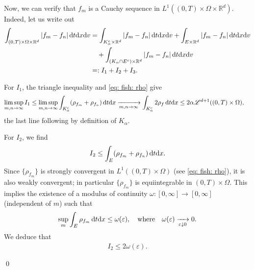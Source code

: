 \documentclass[10pt, reqno]{amsart}
\theoremstyle{plain}
\theoremstyle{definition}
\theoremstyle{remark}
\renewenvironment{proof}[1][\proofname]{\noindent{\scshape #1.\quad}}{\qed}
\numberwithin{equation}{section}
\newcommand{\R}{\mathbb{R}}
\newcommand{\ve}{\varepsilon}
\newcommand{\dx}{\textnormal{d}x}
\newcommand{\dv}{\textnormal{d}v}
\newcommand{\dt}{\textnormal{d}t}
\begin{document}
\begin{proof}[Proof of Lemma \ref{lem: key compactness}]
    Now, we can verify that $f_m$ is a Cauchy sequence in $L^1((0,T)\times\Omega\times\R^d)$. Indeed, let us write out
    \begin{align*}
 \int_{(0,T)\times\Omega\times\R^d} |f_m - f_n| \,\dt\dx\dv  
        &= \int_{K_\alpha^c \times \R^d} |f_m - f_n|\,\dt\dx\dv + \int_{E\times \R^d} |f_m - f_n|\,\dt\dx\dv \\
        &\quad + \int_{(K_\alpha \cap E^c)\times \R^d} |f_m - f_n|\,\dt\dx\dv \\
        &=: I_1 + I_2 + I_3.
    \end{align*}
    
    For $I_1$, the triangle inequality and \eqref{eq: fish: rho} give
    \begin{align*}
        \limsup_{m,n\to\infty} I_1 &\le \limsup_{m,n\to\infty} \int_{K_\alpha^c} (\rho_{f_m} + \rho_{f_n}) \,\dt\dx  \xrightarrow[m,n\to\infty]{} \int_{K_\alpha^c} 2\rho_f \,\dt\dx  \le 2\alpha \mathscr{L}^{d+1}((0,T)\times\Omega),
    \end{align*}
    the last line following by definition of $K_\alpha$.

    For $I_2$, we find 
    \begin{align*}
        I_2 \le \int_E (\rho_{f_m} + \rho_{f_n}) \,\dt\dx.
    \end{align*}
    Since $\{\rho_{f_m}\}$ is strongly convergent in $L^1((0,T)\times\Omega)$ (see \eqref{eq: fish: rho}), it is also weakly convergent; in particular $\{\rho_{f_m}\}$ is equiintegrable in $(0,T)\times\Omega$. This implies the existence of a modulus of continuity $\omega:[0,\infty]\to [0,\infty]$ (independent of $m$) such that
    \begin{align*}
        \sup_m \int_E \rho_{f_m} \,\dt\dx \le \omega(\ve) , \quad \text{where} \quad  \omega(\ve)\xrightarrow[\ve\downarrow 0]{} 0.
    \end{align*}
    We deduce that
    \begin{align*}
     I_2 \le 2 \omega(\ve).   
    \end{align*}


\end{proof}
\end{document}

